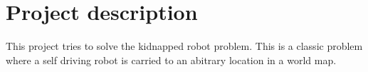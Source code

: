 \chapter{Project description}
\label{chp:sysdes}

This project tries to solve the kidnapped robot problem. This is a classic problem where a self driving robot is carried to an abitrary location in a world map.
